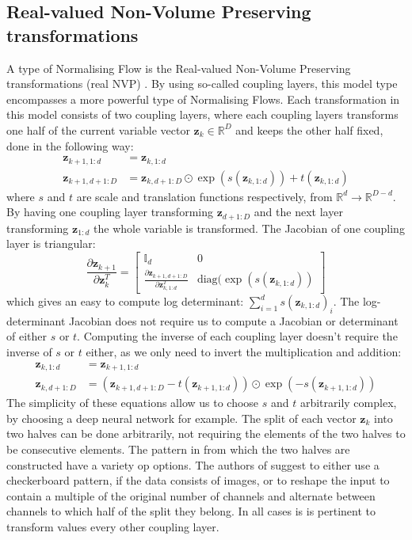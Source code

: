\documentclass{report}
\newcommand{\bz}{\mathbf{z}}
\newcommand{\parfrac}[2]{\frac{\partial #1}{\partial#2}}
\begin{document}
\subsection{Real-valued Non-Volume Preserving transformations}
A type of Normalising Flow is the Real-valued Non-Volume Preserving transformations (real NVP) \cite{dinh2016density}. By using so-called coupling layers, this model type encompasses a more powerful type of Normalising Flows. Each transformation in this model consists of two coupling layers, where each coupling layers transforms one half of the current variable vector $\bz_k \in \mathbb{R}^D$ and keeps the other half fixed, done in the following way:
\begin{align}\label{equation:real_nvp_coupling}
    \bz_{k+1, 1:d} &= \bz_{k, 1:d} \\
    \bz_{k+1, d+1:D} &= \bz_{k, d+1:D} \odot \exp \left(s(\bz_{k, 1:d}) \right) + t(\bz_{k, 1:d})
\end{align}
where $s$ and $t$ are scale and translation functions respectively, from $\mathbb{R}^{d} \rightarrow \mathbb{R}^{D-d}$. By having one coupling layer transforming $\bz_{d+1:D}$ and the next layer transforming $\bz_{1:d}$ the whole variable is transformed. The Jacobian of one coupling layer is triangular:
\begin{equation}
    \parfrac{\bz_{k+1}}{\bz_k^T} = \begin{bmatrix}
    \mathbb{I}_d & 0\\
    \parfrac{\bz_{k+1, d+1:D}}{\bz_{k, 1:d}^T} & \text{diag}(\exp(s(\bz_{k, 1:d}))
    \end{bmatrix}
\end{equation}
which gives an easy to compute log determinant: $\sum\limits^d_{i=1} s(\bz_{k, 1:d})_i$. The log-determinant Jacobian  does not require us to compute a Jacobian or determinant of either $s$ or $t$. Computing the inverse of each coupling layer doesn't require the inverse of $s$ or $t$ either, as we only need to invert the multiplication and addition:
\begin{align}\label{equation:real_nvp_coupling_inverse}
    \bz_{k, 1:d} &= \bz_{k+1, 1:d} \\
    \bz_{k, d+1:D} &= (\bz_{k+1, d+1:D} - t(\bz_{k+1, 1:d})) \odot \exp \left(- s(\bz_{k+1, 1:d}) \right) 
\end{align}
The simplicity of these equations allow us to choose $s$ and $t$ arbitrarily complex, by choosing a deep neural network for example. The split of each vector $\bz_k$ into two halves can be done arbitrarily, not requiring the elements of the two halves to be consecutive elements. The pattern in from which the two halves are constructed have a variety op options. The authors of \cite{dinh2016density} suggest to  either use a checkerboard pattern, if the data consists of images, or to reshape the input to contain a multiple of the original number of channels and alternate between channels to which half of the split they belong. In all cases is is pertinent to transform values every other coupling layer.
\end{document}
